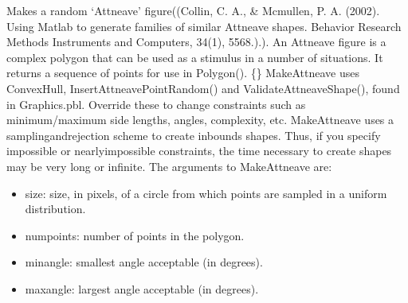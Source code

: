 \documentclass[letterpaper,10pt,english]{sphinxmanual}
\begin{document}
\sphinxAtStartPar
{}

\sphinxAtStartPar
Makes a random ‘Attneave’ figure((Collin, C. A., \& Mcmullen, P. A. (2002). Using Matlab to generate  families of similar Attneave shapes. Behavior Research Methods  Instruments and Computers, 34(1), 55\sphinxhyphen{}68.).). An Attneave figure is a complex polygon that can be used as a stimulus in a number of situations.  It returns a sequence of points for use in Polygon().  \{\} MakeAttneave uses ConvexHull,  InsertAttneavePointRandom() and ValidateAttneaveShape(), found in Graphics.pbl.  Override these to change constraints such as  minimum/maximum side lengths, angles, complexity, etc.  MakeAttneave uses a sampling\sphinxhyphen{}and\sphinxhyphen{}rejection scheme to create in\sphinxhyphen{}bounds shapes.  Thus, if you specify impossible or nearly\sphinxhyphen{}impossible constraints, the time necessary to create shapes may be very long or infinite.   The arguments to MakeAttneave are:
\begin{itemize}
\item {} 
\sphinxAtStartPar
size: size, in pixels, of a circle from which points are   sampled in a uniform distribution.

\item {} 
\sphinxAtStartPar
numpoints: number of points in the polygon.

\item {} 
\sphinxAtStartPar
minangle: smallest angle acceptable (in degrees).

\item {} 
\sphinxAtStartPar
maxangle: largest angle acceptable  (in degrees).

\end{itemize}

\sphinxAtStartPar
{}

\begin{sphinxVerbatim}[commandchars=\\\{\}]
\end{sphinxVerbatim}

\sphinxAtStartPar
{}
\end{document}
